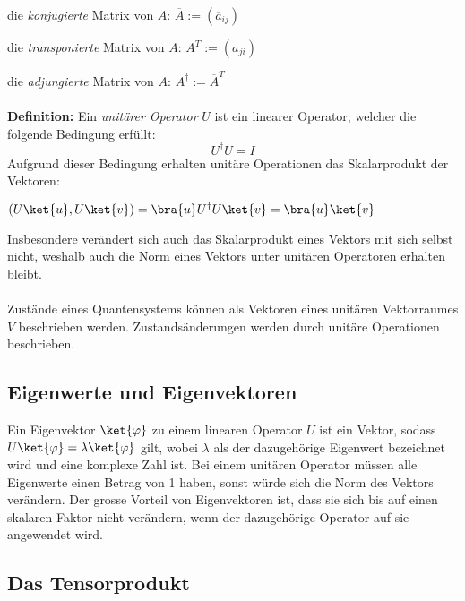 \vspace{0.3cm}
die \textit{konjugierte} Matrix von $A$: \quad$\overline{A}:=(\overline{a}_{ij})$

\vspace{0.1cm}
die \textit{transponierte} Matrix von $A$: \quad $A^{T}:=(a_{ji})$

\vspace{0.1cm}
die \textit{adjungierte} Matrix von $A$: \quad $A^{\dag}:=\overline{A}^{T}$

\paragraph{}

\textbf{Definition:} Ein \textit{unitärer Operator} $U$ ist ein linearer Operator, welcher die folgende Bedingung erfüllt: $$U^\dagger U = I$$
Aufgrund dieser Bedingung erhalten unitäre Operationen das Skalarprodukt der Vektoren:

\vspace{0.3cm}
\centerline{ $(U\ket{u}, U\ket{v}) = \bra{u}U^\dagger U\ket{v} = \bra{u}\ket{v}$ }

\vspace{0.3cm}
Insbesondere verändert sich auch das Skalarprodukt eines Vektors mit sich selbst nicht, weshalb auch die Norm eines Vektors unter unitären Operatoren erhalten bleibt.
\paragraph{}


Zustände eines Quantensystems können als Vektoren eines unitären Vektorraumes $V$ beschrieben werden. Zustandsänderungen werden durch unitäre Operationen beschrieben.

\subsection{Eigenwerte und Eigenvektoren}
Ein Eigenvektor $\ket{\varphi}$ zu einem linearen Operator $U$ ist ein Vektor, sodass $U\ket{\varphi} = \lambda\ket{\varphi}$ gilt, wobei $\lambda$ als der dazugehörige Eigenwert bezeichnet wird und eine komplexe Zahl ist. Bei einem unitären Operator müssen alle Eigenwerte einen Betrag von 1 haben, sonst würde sich die Norm des Vektors verändern. Der grosse Vorteil von Eigenvektoren ist, dass sie sich bis auf einen skalaren Faktor nicht verändern, wenn der dazugehörige Operator auf sie angewendet wird.

\subsection{Das Tensorprodukt}
